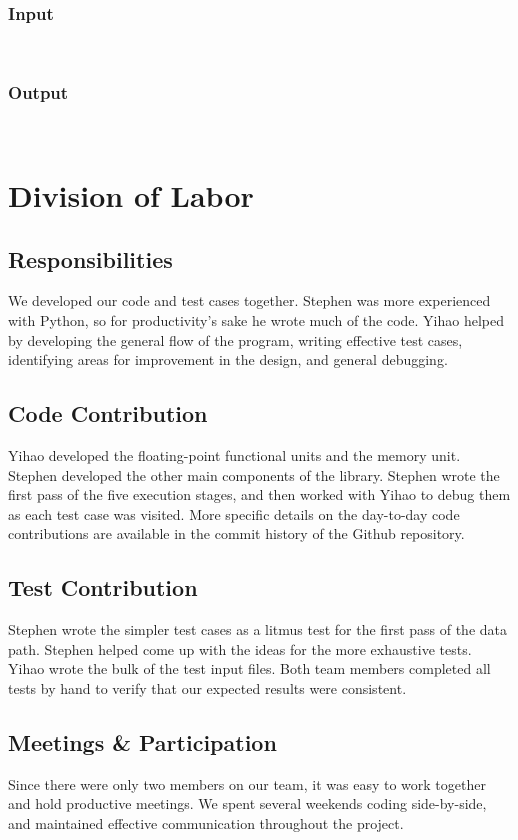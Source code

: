 \documentclass[12pt]{article}
\begin{document}
\subsubsection*{Input}
\begin{verbatim}
    
\end{verbatim}

\subsubsection*{Output}
\begin{verbatim}
    
\end{verbatim}

\section{Division of Labor}
\subsection{Responsibilities}
We developed our code and test cases together.  Stephen was more experienced with Python, so for productivity's sake he wrote much of the code.  Yihao helped by developing the general flow of the program, writing effective test cases, identifying areas for improvement in the design, and general debugging.

\subsection{Code Contribution}
Yihao developed the floating-point functional units and the memory unit.  Stephen developed the other main components of the library.  Stephen wrote the first pass of the five execution stages, and then worked with Yihao to debug them as each test case was visited.  More specific details on the day-to-day code contributions are available in the commit history of the Github repository.

\subsection{Test Contribution}
Stephen wrote the simpler test cases as a litmus test for the first pass of the data path.  Stephen helped come up with the ideas for the more exhaustive tests.  Yihao wrote the bulk of the test input files.  Both team members completed all tests by hand to verify that our expected results were consistent.

\subsection{Meetings \& Participation}
Since there were only two members on our team, it was easy to work together and hold productive meetings.  We spent several weekends coding side-by-side, and maintained effective communication throughout the project.
\end{document}
